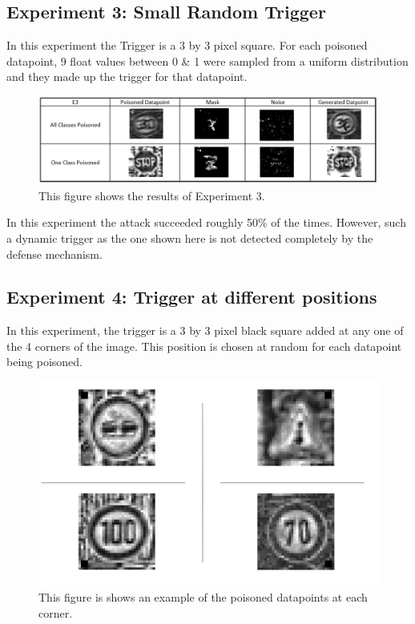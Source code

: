\documentclass{article}
\begin{document}
\subsection{Experiment 3: Small Random Trigger}
In this experiment the Trigger is a 3 by 3 pixel square. For each poisoned datapoint, 9 float values between 0 \& 1 were sampled from a uniform distribution and they made up the trigger for that datapoint.
\begin{figure}[H]
    \centering
    \includegraphics[width=.75\textwidth]{E3.PNG}
    \caption{This figure shows the results of Experiment 3.}
    \label{fig:E3}
\end{figure}
In this experiment the attack succeeded roughly 50\% of the times. However, such a dynamic trigger as the one shown here is not detected completely by the defense mechanism.
\subsection{Experiment 4: Trigger at different positions}
In this experiment, the trigger is a 3 by 3 pixel black square added at any one of the 4 corners of the image. This position is chosen at random for each datapoint being poisoned.
\begin{figure}[h]
    \centering
    \includegraphics[width=.75\textwidth]{E4_1.PNG}
    \caption{This figure is shows an example of the poisoned datapoints at each corner.}
    \label{fig:E4a}
\end{figure}
\end{document}
